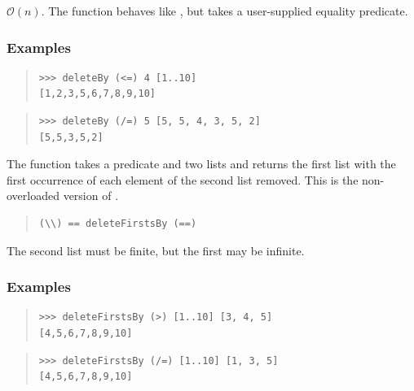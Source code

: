 \begin{haddockdesc}
\item[\begin{tabular}{@{}l}
deleteBy :: (a -> a -> Bool) -> a -> {\char 91}a{\char 93} -> {\char 91}a{\char 93}
\end{tabular}]
{\haddockbegindoc
\(\mathcal{O}(n)\). The  function behaves like , but
 takes a user-supplied equality predicate.\par
\subsubsection*{\textbf{Examples}}
\begin{quote}
{\haddockverb\begin{verbatim}
>>> deleteBy (<=) 4 [1..10]
[1,2,3,5,6,7,8,9,10]

\end{verbatim}}
\end{quote}
\begin{quote}
{\haddockverb\begin{verbatim}
>>> deleteBy (/=) 5 [5, 5, 4, 3, 5, 2]
[5,5,3,5,2]

\end{verbatim}}
\end{quote}}
\end{haddockdesc}
\begin{haddockdesc}
\item[\begin{tabular}{@{}l}
deleteFirstsBy :: (a -> a -> Bool) -> {\char 91}a{\char 93} -> {\char 91}a{\char 93} -> {\char 91}a{\char 93}
\end{tabular}]
{\haddockbegindoc
The  function takes a predicate and two lists and
 returns the first list with the first occurrence of each element of
 the second list removed. This is the non-overloaded version of .\par
\begin{quote}
{\haddockverb\begin{verbatim}
(\\) == deleteFirstsBy (==)\end{verbatim}}
\end{quote}
The second list must be finite, but the first may be infinite.\par
\subsubsection*{\textbf{Examples}}
\begin{quote}
{\haddockverb\begin{verbatim}
>>> deleteFirstsBy (>) [1..10] [3, 4, 5]
[4,5,6,7,8,9,10]

\end{verbatim}}
\end{quote}
\begin{quote}
{\haddockverb\begin{verbatim}
>>> deleteFirstsBy (/=) [1..10] [1, 3, 5]
[4,5,6,7,8,9,10]

\end{verbatim}}
\end{quote}}
\end{haddockdesc}
